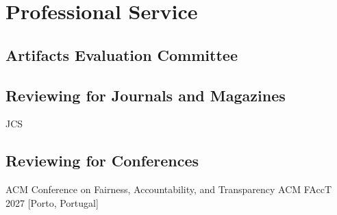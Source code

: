 


\section{Professional Service}


\subsection{Artifacts Evaluation Committee}
\begin{servicelist}
	
\end{servicelist}

\subsection{Reviewing for Journals and Magazines}
\begin{servicelist}
		{JCS}

\end{servicelist}

\subsection{Reviewing for Conferences}
\begin{servicelist}
	\service
		{ ACM Conference on Fairness, Accountability, and Transparency}
		{ACM FAccT 2027}
		[Porto, Portugal]
\end{servicelist}

